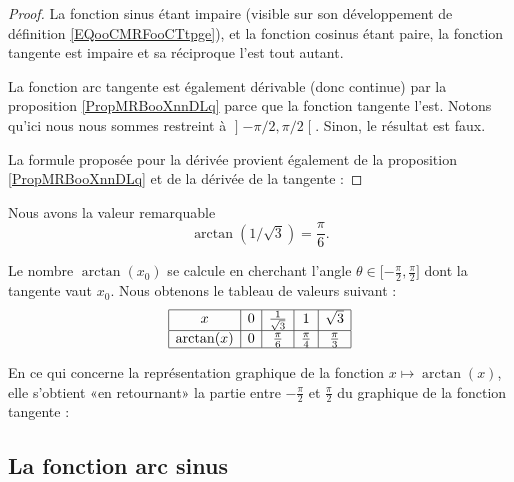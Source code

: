 \begin{proof}
    La fonction sinus étant impaire (visible sur son développement de définition \eqref{EQooCMRFooCTtpge}), et la fonction cosinus étant paire, la fonction tangente est impaire et sa réciproque l'est tout autant.

    La fonction arc tangente est également dérivable (donc continue) par la proposition \ref{PropMRBooXnnDLq} parce que la fonction tangente l'est. Notons qu'ici nous nous sommes restreint à \( \mathopen] -\pi/2 , \pi/2 \mathclose[\). Sinon, le résultat est faux.

    La formule proposée pour la dérivée provient également de la proposition \ref{PropMRBooXnnDLq} et de la dérivée de la tangente :
\end{proof}

\begin{lemma}       \label{LEMooJKIUooEMMOrs}
    Nous avons la valeur remarquable
    \begin{equation}
        \arctan(1/\sqrt{ 3 })=\frac{ \pi }{ 6 }.
    \end{equation}
\end{lemma}

Le nombre \( \arctan(x_0)\) se calcule en cherchant l'angle \( \theta\in\mathopen[ -\frac{ \pi }{2} , \frac{ \pi }{2} \mathclose]\) dont la tangente vaut \( x_0\). Nous obtenons le tableau de valeurs suivant :
\begin{equation*}
    \begin{array}[]{|c|c|c|c|c|}
        \hline
        x&0&\frac{1}{ \sqrt{3} }&1&\sqrt{3}\\
        \hline
        \arctan(x)&0&\frac{ \pi }{ 6 }&\frac{ \pi }{ 4 }&\frac{ \pi }{ 3 }\\
        \hline
    \end{array}
\end{equation*}

En ce qui concerne la représentation graphique de la fonction \( x\mapsto\arctan(x)\), elle s'obtient «en retournant» la partie entre \( -\frac{ \pi }{2}\) et \( \frac{ \pi }{ 2 }\) du graphique de la fonction tangente :
\begin{center}
   
\end{center}

\subsection{La fonction arc sinus}

